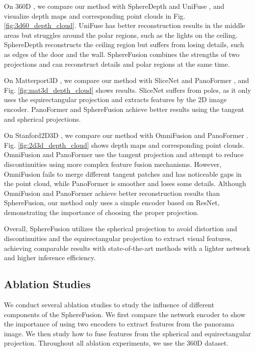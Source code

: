 On 360D \cite{zioulis2018omnidepth}, we compare our method with SphereDepth \cite{yan2022spheredepth} and UniFuse \cite{jiang2021unifuse}, and visualize depth maps and corresponding point clouds in Fig. \ref{fig:3d60_depth_cloud}.
UniFuse has better reconstruction results in the middle areas but struggles around the polar regions, such as the lights on the ceiling. SphereDepth reconstructs the ceiling region but suffers from losing details, such as edges of the door and the wall. SphereFusion combines the strengths of two projections and can reconstruct details and polar regions at the same time.


On Matterport3D \cite{chang2017matterport3d}, we compare our method with SliceNet \cite{pintore2021slicenet} and PanoFormer \cite{shen2022panoformer}, and Fig. \ref{fig:mat3d_depth_cloud} shows  results.
SliceNet suffers from poles, as it only uses the equirectangular projection and extracts features by the 2D image encoder.
PanoFormer and SphereFusion achieve better results using the tangent and spherical projections.


On Stanford2D3D \cite{armeni2017joint}, we compare our method with OmniFusion \cite{yan2022spheredepth} and PanoFormer \cite{jiang2021unifuse}.
Fig. \ref{fig:2d3d_depth_cloud}
shows depth maps and corresponding point clouds.  
OmniFusion and PanoFormer use the tangent projection and attempt to reduce discontinuities using more complex feature fusion mechanisms. 
However, OmniFusion fails to merge different tangent patches and has noticeable gaps in the point cloud, while PanoFormer is smoother and loses some details. 
Although OmniFusion and PanoFormer achieve better reconstruction results than SphereFusion, our method only uses a simple encoder based on ResNet, demonstrating the importance of choosing the proper projection.


Overall, SphereFusion utilizes the spherical projection to avoid distortion and discontinuities and the equirectangular projection to extract visual features, achieving comparable results with state-of-the-art methods with a lighter network and higher inference efficiency.


\subsection{Ablation Studies}

We conduct several ablation studies to study the influence of different components of the SphereFusion. We first compare the network encoder to show the importance of using two encoders to extract features from the panorama image. We then study how to fuse features from the spherical and equirectangular projection. Throughout all ablation experiments, we use the 360D dataset.

